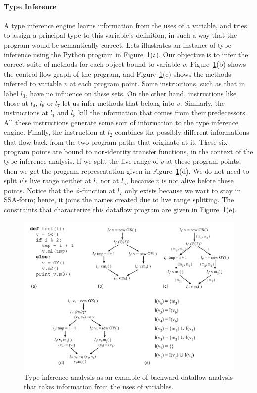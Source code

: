 \paragraph{Type Inference}
A type inference engine learns information from the uses of a variable, and
tries to assign a principal type to this variable's definition, in such a way
that the program would be semantically correct.
Lets illustrates an instance of type inference using the Python program in
Figure~\ref{fig:typeInference}(a).
Our objective is to infer the correct suite of methods for each object bound to
variable $v$.
Figure~\ref{fig:typeInference}(b) shows the control flow graph of the
program, and Figure~\ref{fig:typeInference}(c) shows the methods inferred to
variable $v$ at each program point.
Some instructions, such as that in label $l_3$, have no influence on these sets.
On the other hand, instructions like those at $l_4$, $l_6$ or $l_7$ let
us infer methods that belong into $v$.
Similarly, the instructions at $l_1$ and $l_5$ kill the information that comes
from their predecessors.
All these instructions generate some sort of information to the type inference
engine.
Finally, the instruction at $l_2$ combines the possibly different informations
that flow back from the two program paths that originate at it.
These six program points are bound to non-identity transfer functions, in the
context of the type inference analysis.
If we split the live range of $v$ at these program points, then we get the
program representation given in Figure~\ref{fig:typeInference}(d).
We do not need to split $v$'s live range neither at $l_1$ nor at $l_5$, because
$v$ is not alive before these points.
Notice that the $\phi$-function at $l_7$ only exists because we want to
stay in SSA-form; hence, it joins the names created due to live range splitting.
The constraints that characterize this dataflow program are given in
Figure~\ref{fig:typeInference}(e).

\begin{figure}[t!]
\centering
\includegraphics[width=\linewidth]{fullEx}
\caption{Type inference analysis as an example of backward dataflow analysis
that takes information from the uses of variables.}
\label{fig:typeInference}
\end{figure}

